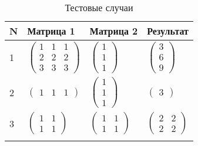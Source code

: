 \begin{table}[H]
	\begin{center}
		\captionsetup{singlelinecheck = false, justification=centering}
		\caption{Тестовые случаи}
		\begin{tabular}{l|l|l|l}
			N & Матрица 1 & Матрица 2 & Результат \\ 
			\hline
			\vspace{2mm}
			\vspace{2mm}
			1 & $\begin{pmatrix}
				1 & 1 & 1\\
				2 & 2 & 2\\
				3 & 3 & 3
			\end{pmatrix}$ &
			$\begin{pmatrix}
				1 \\
				1 \\
				1 
			\end{pmatrix}$ &
			$\begin{pmatrix}
				3 \\
				6 \\
				9
			\end{pmatrix}$ \\
			\vspace{2mm}
			\vspace{2mm}
			2 & $\begin{pmatrix}
				1 & 1 & 1
			\end{pmatrix}$ &
			$\begin{pmatrix}
				1 \\
				1 \\
				1
			\end{pmatrix}$ &
			$\begin{pmatrix}
				3
			\end{pmatrix}$ \\
			\vspace{2mm}
			\vspace{2mm}
			3 & $\begin{pmatrix}
				1 & 1 \\
				1 & 1
			\end{pmatrix}$ &
			$\begin{pmatrix}
				1 & 1\\
				1 & 1
			\end{pmatrix}$ &
			$\begin{pmatrix}
				2 & 2\\
				2 & 2
			\end{pmatrix}$ \\
			\vspace{2mm}

\end{tabular}
\end{center}
\end{table}
